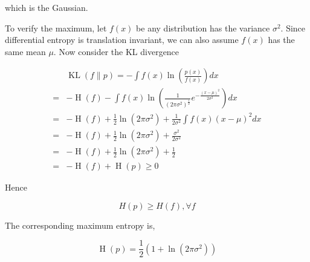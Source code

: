 \documentclass{article}
\begin{document}
            which is the Gaussian.

            To verify the maximum, let $ f(x) $ be any distribution has the
            variance $ \sigma^2 $. Since differential entropy is translation invariant, we can also assume
            $ f(x) $ has the same mean $ \mu $. Now consider the KL divergence

            \begin{align*}
                & \operatorname{KL}(f \| p) = -\int f(x) \ln \left( \frac{p(x)}{f(x)} \right) dx \\
                =& -\operatorname{H}(f) - \int f(x) \ln \left(
                     \frac{1}{ (2 \pi
                     \sigma^2)^{\frac{1}{2}} } e^{
                 -\frac{(x - \mu)^2}{2 \sigma^2} } 
                \right) dx \\
                =& -\operatorname{H}(f) + \frac{1}{2} \ln (2 \pi \sigma^{2}) +
                \frac{1}{2 \sigma^{2}} \int f(x) (x - \mu)^{2} dx \\
                =& -\operatorname{H}(f) + \frac{1}{2} \ln (2 \pi \sigma^{2}) + \frac{\sigma^{2}}{2 \sigma^{2}} \\
                =& -\operatorname{H}(f) + \frac{1}{2} \ln (2 \pi \sigma^{2}) + \frac{1}{2} \\
                =& -\operatorname{H}(f) + \operatorname{H}(p) \geq 0
            \end{align*}

            Hence

            \begin{equation*}
                 H(p) \geq H(f), \forall f
            \end{equation*}

            The corresponding maximum entropy is,

            \begin{equation*}
                 \operatorname{H}(p) = \frac{1}{2} (1 + \ln(2 \pi \sigma^2))
            \end{equation*}
\end{document}
